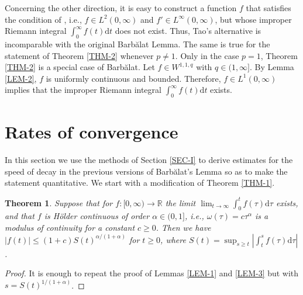 \documentclass[10pt, a4paper, reqno]{amsart}
\theoremstyle{normal}
\newtheorem{thm}{Theorem}
\newcommand{\dd}{\mathrm{d}}
\begin{document}
\medskip

Concerning the other direction, it is easy to construct a function $f$ that satisfies the condition of \cite[Lemma 1]{Tao}, i.e., $f\in L^2(0,\infty)$ and $f'\in L^{\infty}(0,\infty)$, but whose improper Riemann integral $\int_0^{\infty}f(t) \dd t$ does not exist. Thus, Tao's alternative is incomparable with the original Barb\u{a}lat Lemma. The same is true for the statement of Theorem \ref{THM-2} whenever $p\not=1$. Only in the case $p=1$, Theorem \ref{THM-2} is a special case of Barb\u{a}lat. Let $f\in W^{1,1,q}$ with $q\in(1,\infty]$. By Lemma \ref{LEM-2}, $f$ is uniformly continuous and bounded. Therefore, $f\in L^1(0,\infty)$ implies that the improper Riemann integral $\int_0^{\infty}f(t)\dd t$ exists.





\bigskip

\section{Rates of convergence}\label{SEC-III}

In this section we use the methods of Section \ref{SEC-I} to derive estimates for the speed of decay in the previous versions of Barb\u{a}lat's Lemma so as to make the statement quantitative. We start with  a modification of Theorem \ref{THM-1}.

\smallskip

\begin{thm}\label{THM-3} Suppose that for $f\colon[0,\infty)\rightarrow\mathbb{R}$ the limit $\lim_{t\rightarrow\infty}\int_0^tf(\tau)\dd\tau$ exists, and that $f$ is H\"older continuous of order $\alpha\in(0,1]$, i.e., $\omega(\tau)=c\tau^{\alpha}$ is a modulus of continuity for a constant $c\geqslant0$.  Then we have $|f(t)|\leqslant(1+c)S(t)^{\alpha/(1+\alpha)}$ for $t\geqslant0$, where $S(t)=\sup_{s\geqslant{}t}|\int_t^sf(\tau)\dd\tau|$.
\end{thm}

\begin{proof} It is enough to repeat the proof of Lemmas \ref{LEM-1}  and \ref{LEM-3} but with $s=S(t)^{1/(1+\alpha)}$.
\end{proof}
\end{document}
